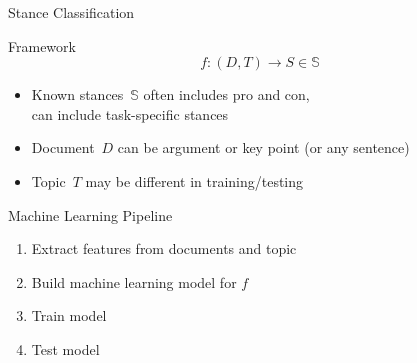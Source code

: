 \documentclass[english,handout]{mlutalk}
\begin{document}
\begin{frame}{Stance Classification}

  \begin{block}{Framework}
    \begin{equation*}
      f: (D,T) \rightarrow S \in \mathbb{S}
    \end{equation*}  
    \begin{itemize}
      \item Known stances~\(\mathbb{S}\) often includes pro and con, \\ can include task-specific stances
      \item Document~\(D\) can be argument or key point (or any sentence)
      \item Topic~\(T\) may be different in training/testing
    \end{itemize}
  \end{block}

  \begin{block}{Machine Learning Pipeline}
    \begin{enumerate}
        \item Extract features from documents and topic
        \item Build machine learning model for \(f\)
        \item Train model
        \item Test model
      \end{enumerate}
  \end{block}

\end{frame}
\end{document}
